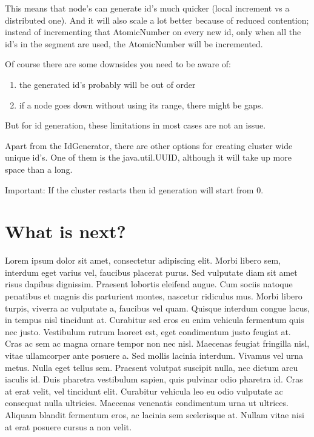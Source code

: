 This means that node's can generate id's much quicker (local increment vs a distributed
one). And it will also scale a lot better because of reduced contention; instead of incrementing
that AtomicNumber on every new id, only when all the id's in the segment are used, the
AtomicNumber will be incremented.

Of course there are some downsides you need to be aware of:
\begin{enumerate}
\item the generated id's probably will be out of order
\item if a node goes down without using its range, there might be gaps.
\end{enumerate}
But for id generation, these limitations in most cases are not an issue.

Apart from the IdGenerator, there are other options for creating cluster wide unique id's.
One of them is the java.util.UUID, although it will take up more space than a long. 

Important: If the cluster restarts then id generation will start from 0.

\section{What is next?}
Lorem ipsum dolor sit amet, consectetur adipiscing elit. Morbi libero sem,
interdum eget varius vel, faucibus placerat purus. Sed vulputate diam sit amet
risus dapibus dignissim. Praesent lobortis eleifend augue. Cum sociis natoque
penatibus et magnis dis parturient montes, nascetur ridiculus mus. Morbi libero
turpis, viverra ac vulputate a, faucibus vel quam. Quisque interdum congue
lacus, in tempus nisl tincidunt at. Curabitur sed eros eu enim vehicula
fermentum quis nec justo. Vestibulum rutrum laoreet est, eget condimentum justo
feugiat at. Cras ac sem ac magna ornare tempor non nec nisl. Maecenas feugiat
fringilla nisl, vitae ullamcorper ante posuere a. Sed mollis lacinia interdum.
Vivamus vel urna metus. Nulla eget tellus sem. Praesent volutpat suscipit nulla,
nec dictum arcu iaculis id. Duis pharetra vestibulum sapien, quis pulvinar odio
pharetra id. Cras at erat velit, vel tincidunt elit. Curabitur vehicula leo eu
odio vulputate ac consequat nulla ultricies. Maecenas venenatis condimentum
urna ut ultrices. Aliquam blandit fermentum eros, ac lacinia sem scelerisque
at. Nullam vitae nisi at erat posuere cursus a non velit.
